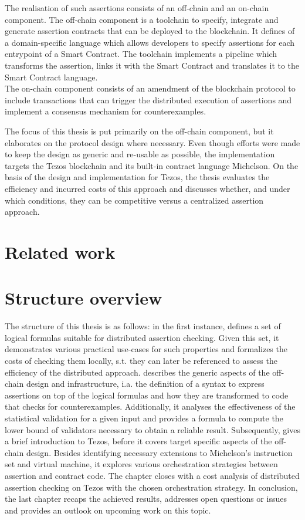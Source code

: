 The realisation of such assertions consists of an off-chain and an on-chain component. The off-chain component is a toolchain to specify, integrate and generate assertion contracts that can be deployed to the blockchain. It defines of a domain-specific language which allows developers to specify assertions for each entrypoint of a Smart Contract. The toolchain implements a pipeline which transforms the assertion, links it with the Smart Contract and translates it to the Smart Contract language. \\
The on-chain component consists of an amendment of the blockchain protocol to include transactions that can trigger the distributed execution of assertions and implement a consensus mechanism for counterexamples. 

The focus of this thesis is put primarily on the off-chain component, but it elaborates on the protocol design where necessary.  Even though efforts were made to keep the design as generic and re-usable as possible, the implementation targets the Tezos blockchain and its built-in contract language Michelson. On the basis of the design and implementation for Tezos, the thesis evaluates the efficiency and incurred costs of this approach and discusses whether, and under which conditions, they can be competitive versus a centralized assertion approach.

\section{Related work}


\section{Structure overview}
The structure of this thesis is as follows: in the first instance,  defines a set of logical formulas suitable for distributed assertion checking. Given this set, it demonstrates various practical use-cases for such properties and formalizes the costs of checking them locally, s.t. they can later be referenced to assess the efficiency of the distributed approach.  describes the generic aspects of the off-chain design and infrastructure, i.a. the definition of a syntax to express assertions on top of the logical formulas and how they are transformed to code that checks for counterexamples. Additionally, it analyses the effectiveness of the statistical validation for a given input and provides a formula to compute the lower bound of validators necessary to obtain a reliable result. Subsequently,  gives a brief introduction to Tezos, before it covers target specific aspects of the off-chain design. Besides identifying necessary extensions to Michelson's instruction set and virtual machine, it explores various orchestration strategies between assertion and contract code. The chapter closes with a cost analysis of distributed assertion checking on Tezos with the chosen orchestration strategy. In conclusion, the last chapter recaps the achieved results, 
addresses open questions or issues and provides an outlook on upcoming work on this topic.